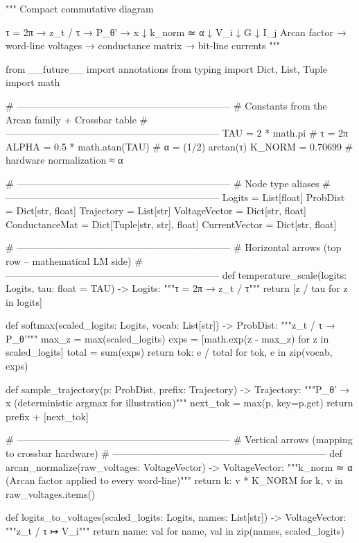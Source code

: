 """
Compact commutative diagram

τ = 2π  →  z_t / τ  →  P_θ'  →  x
 ↓ k_norm ≃ α          ↓ V_i      ↓ G      ↓ I_j
Arcan factor  →  word-line voltages  →  conductance matrix  →  bit-line currents
"""

from __future__ import annotations
from typing import Dict, List, Tuple
import math

# ------------------------------------------------------------------
# Constants from the Arcan family + Crossbar table
# ------------------------------------------------------------------
TAU = 2 * math.pi                          # τ = 2π
ALPHA = 0.5 * math.atan(TAU)               # α = (1/2) arctan(τ)
K_NORM = 0.70699                           # hardware normalization ≈ α

# ------------------------------------------------------------------
# Node type aliases
# ------------------------------------------------------------------
Logits          = List[float]
ProbDist        = Dict[str, float]
Trajectory      = List[str]
VoltageVector   = Dict[str, float]
ConductanceMat  = Dict[Tuple[str, str], float]
CurrentVector   = Dict[str, float]

# ------------------------------------------------------------------
# Horizontal arrows (top row – mathematical LM side)
# ------------------------------------------------------------------
def temperature_scale(logits: Logits, tau: float = TAU) -> Logits:
    """τ = 2π  →  z_t / τ"""
    return [z / tau for z in logits]

def softmax(scaled_logits: Logits, vocab: List[str]) -> ProbDist:
    """z_t / τ  →  P_θ'"""
    max_z = max(scaled_logits)
    exps = [math.exp(z - max_z) for z in scaled_logits]
    total = sum(exps)
    return {tok: e / total for tok, e in zip(vocab, exps)}

def sample_trajectory(p: ProbDist, prefix: Trajectory) -> Trajectory:
    """P_θ'  →  x  (deterministic argmax for illustration)"""
    next_tok = max(p, key=p.get)
    return prefix + [next_tok]

# ------------------------------------------------------------------
# Vertical arrows (mapping to crossbar hardware)
# ------------------------------------------------------------------
def arcan_normalize(raw_voltages: VoltageVector) -> VoltageVector:
    """k_norm ≃ α  (Arcan factor applied to every word-line)"""
    return {k: v * K_NORM for k, v in raw_voltages.items()}

def logits_to_voltages(scaled_logits: Logits, names: List[str]) -> VoltageVector:
    """z_t / τ  ↦  V_i"""
    return {name: val for name, val in zip(names, scaled_logits)}

